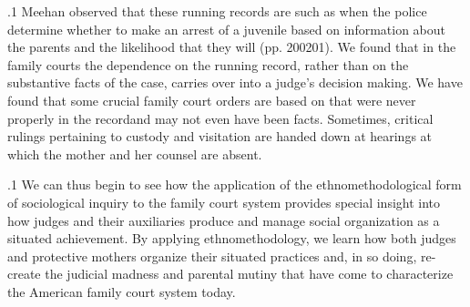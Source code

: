 \documentclass[11pt, twoside]{article}
\begin{document}
{\p.1{%
Meehan observed that these running records are  such as when the police determine whether
to make an arrest of a juvenile based on information about the parents
and the likelihood that they will  (pp. 200\ndash{}201). We found that in the family courts the dependence
on the running record, rather than on the substantive facts of the case,
carries over into a judge’s decision making. We have found that some
crucial family court orders are based on  that were never properly
in the record\mdash{}and may not even have been facts. Sometimes, critical
rulings pertaining to custody and visitation are handed down at hearings
at which the mother and her counsel are absent.
}%

\p.1{%
We can thus begin to see how the application of the ethnomethodological form of sociological inquiry to the family court system provides special insight into how judges and their auxiliaries produce
and manage social organization as a situated achievement. By applying
ethnomethodology, we learn how both judges and protective mothers
organize their situated practices and, in so doing, re-create the judicial madness and parental mutiny that have come to characterize the
American family court system today.
}%





}
\end{document}
